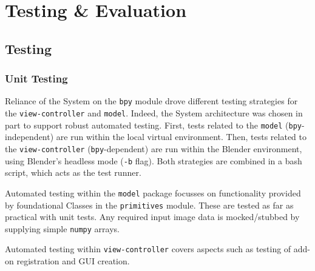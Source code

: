 


\chapter{Testing \& Evaluation}\label{testing_evaluation}

\section{Testing}

\subsection{Unit Testing}

Reliance of the System on the \texttt{bpy} module drove different testing strategies for the \texttt{view-controller} and \texttt{model}.
Indeed, the System architecture was chosen in part to support robust automated testing.
First, tests related to the \texttt{model} (\texttt{bpy}-independent) are run within the local virtual environment.
Then, tests related to  the \texttt{view-controller} (\texttt{bpy}-dependent) are run within the Blender environment, using Blender's headless mode (\texttt{-b} flag).
Both strategies are combined in a bash script, which acts as the test runner.



Automated testing within the \texttt{model} package focusses on functionality provided by foundational Classes in the \texttt{primitives} module.
These are tested as far as practical with unit tests. 
Any required input image data is mocked/stubbed by supplying simple \texttt{numpy} arrays.

Automated testing within \texttt{view-controller} covers aspects such as testing of add-on registration and GUI creation.

